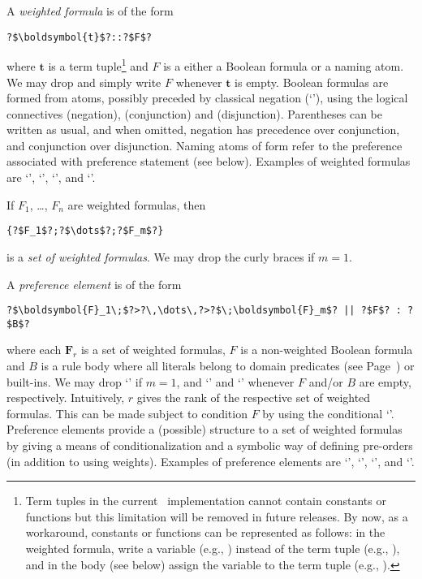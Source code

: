 A \emph{weighted formula} is of the form
\begin{lstlisting}[numbers=none,escapechar=?]
?$\boldsymbol{t}$?::?$F$?
\end{lstlisting}
where $\boldsymbol{t}$ is a term tuple\footnote{%
Term tuples in the current \asprin\ implementation cannot contain constants or functions
but this limitation will be removed in future releases. 
By now, as a workaround, constants or functions can be represented as follows:
in the weighted formula, write a variable (e.g., ) instead of the term tuple (e.g., ),  
and in the body (see below) assign the variable to the term tuple (e.g., ).
}
and $F$ is a either a Boolean formula or a naming atom.
We may drop \code{::} and simply write $F$ whenever $\boldsymbol{t}$ is empty.
Boolean formulas are formed from atoms, possibly preceded by classical negation (`\code{-}'),
using the logical connectives \code{\~} (negation), \code{\&} (conjunction) and \code{|} (disjunction).
Parentheses can be written as usual,
and when omitted, negation has precedence over conjunction, and conjunction over disjunction.
%
Naming atoms of form 
refer to the preference associated with preference statement  (see below).
%
Examples of weighted formulas are 
`', 
`', 
`', and 
`'. 

If $F_1$, \ldots, $F_n$ are weighted formulas, then
\begin{lstlisting}[numbers=none,escapechar=?]
{?$F_1$?;?$\dots$?;?$F_m$?}
\end{lstlisting}
is a \emph{set of weighted formulas}.  
We may drop the curly braces if $m=1$.

A \emph{preference element} is of the form
\begin{lstlisting}[numbers=none,escapechar=?]
?$\boldsymbol{F}_1\;$?>?\,\dots\,?>?$\;\boldsymbol{F}_m$? || ?$F$? : ?$B$?
\end{lstlisting}
where each $\boldsymbol{F}_r$ is a set of weighted formulas, 
$F$ is a non-weighted Boolean formula
and $B$ is a rule body where all literals belong to domain predicates
(see Page~\pageref{pg:domain}) or built-ins.
%
We may drop `\code{>}' if $m=1$, 
and `' and `' whenever $F$ and/or $B$ are empty, respectively.
%
Intuitively, $r$ gives the rank of the respective set of weighted formulas.
This can be made subject to condition $F$ by using the conditional `\code{||}'.
Preference elements provide a (possible) structure to a set of weighted formulas
by giving a means of conditionalization and a symbolic way of defining pre-orders (in addition to using weights).
%
%
Examples of preference elements are 
`',  
`', 
`',  and
`'.

